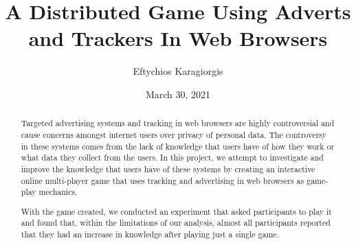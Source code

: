 \documentclass{l4proj}
\begin{document}
\title{A Distributed Game Using Adverts and Trackers In Web Browsers}
\author{Eftychios Karagiorgis}
\date{March 30, 2021}

\maketitle

\begin{abstract}
Targeted advertising systems and tracking in web browsers are highly controversial and cause concerns amongst internet users over privacy of personal data. The controversy in these systems comes from the lack of knowledge that users have of how they work or what data they collect from the users. In this project, we attempt to investigate and improve the knowledge that users have of these systems by creating an interactive online multi-player game that uses tracking and advertising in web browsers as game-play mechanics. 

With the game created, we conducted an experiment that asked participants to play it and found that, within the limitations of our analysis, almost all participants reported that they had an increase in knowledge after playing just a single game.
\end{abstract}


%
%
%
\educationalconsent


\tableofcontents
\end{document}
